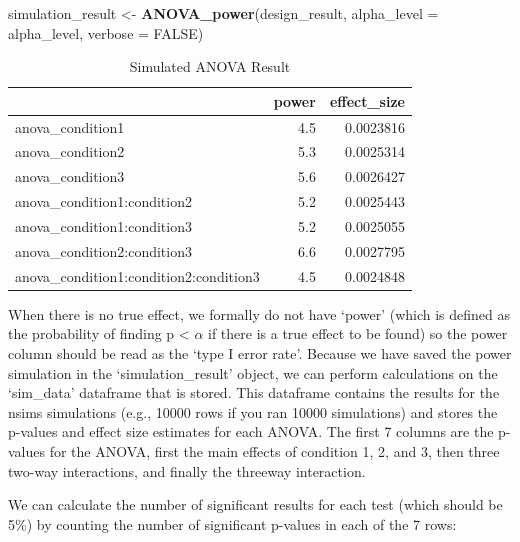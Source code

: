 \documentclass[]{book}
\newenvironment{Shaded}{\begin{snugshade}}{\end{snugshade}}
\newcommand{\DataTypeTok}[1]{\textcolor[rgb]{0.13,0.29,0.53}{#1}}
\newcommand{\KeywordTok}[1]{\textcolor[rgb]{0.13,0.29,0.53}{\textbf{#1}}}
\newcommand{\NormalTok}[1]{#1}
\newcommand{\OtherTok}[1]{\textcolor[rgb]{0.56,0.35,0.01}{#1}}
\newcommand{\StringTok}[1]{\textcolor[rgb]{0.31,0.60,0.02}{#1}}
\begin{document}
\begin{Shaded}
\begin{Highlighting}[]
\NormalTok{simulation_result <-}\StringTok{ }\KeywordTok{ANOVA_power}\NormalTok{(design_result,}
                                 \DataTypeTok{alpha_level =}\NormalTok{ alpha_level,}
                                 \DataTypeTok{verbose =} \OtherTok{FALSE}\NormalTok{)}
\end{Highlighting}
\end{Shaded}

\begin{table}[!h]

\caption{\label{tab:unnamed-chunk-295}Simulated ANOVA Result}
\centering
\begin{tabular}{l|r|r}
\hline
  & power & effect\_size\\
\hline
anova\_condition1 & 4.5 & 0.0023816\\
\hline
anova\_condition2 & 5.3 & 0.0025314\\
\hline
anova\_condition3 & 5.6 & 0.0026427\\
\hline
anova\_condition1:condition2 & 5.2 & 0.0025443\\
\hline
anova\_condition1:condition3 & 5.2 & 0.0025055\\
\hline
anova\_condition2:condition3 & 6.6 & 0.0027795\\
\hline
anova\_condition1:condition2:condition3 & 4.5 & 0.0024848\\
\hline
\end{tabular}
\end{table}

When there is no true effect, we formally do not have `power' (which is defined as the probability of finding p \textless{} \(\alpha\) if there is a true effect to be found) so the power column should be read as the `type I error rate'. Because we have saved the power simulation in the `simulation\_result' object, we can perform calculations on the `sim\_data' dataframe that is stored. This dataframe contains the results for the nsims simulations (e.g., 10000 rows if you ran 10000 simulations) and stores the p-values and effect size estimates for each ANOVA. The first 7 columns are the p-values for the ANOVA, first the main effects of condition 1, 2, and 3, then three two-way interactions, and finally the threeway interaction.

We can calculate the number of significant results for each test (which should be 5\%) by counting the number of significant p-values in each of the 7 rows:
\end{document}
